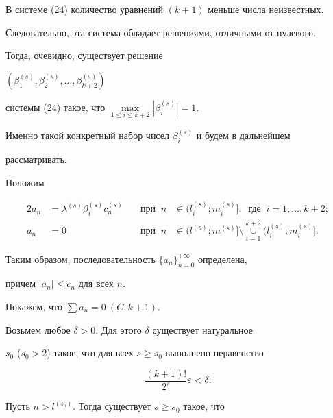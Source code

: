 В системе (24) количество уравнений $(k+1)$ меньше числа неизвестных.


Следовательно, эта система обладает решениями, отличными от нулевого. 


Тогда, очевидно, существует решение 


$(\beta_1^{(s)},\beta_2^{(s)}, \dotsc, \beta_{k+2}^{(s)})$ 


системы (24) такое, что $\max\limits_{1 \le i \le k+2}|\beta_i^{(s)}|=1$.


Именно такой конкретный набор чисел $\beta_i^{(s)}$ и будем в дальнейшем 


рассматривать.





Положим 


\begin{alignat*}{2}


a_n&=\lambda^{(s)} \beta_i^{(s)} c_n^{(s)} &\quad \text{при } 


\ n &\in (l_i^{(s)}; m_i^{(s)}],\ \text{ где }\ i=1, \dotsc, k+2;\\


%


a_n&=0 &\quad \text{при } \ n &\in (l^{(s)}; m^{(s)}]


\setminus \mathop{\cup}\limits_{i=1}^{k+2} (l_i^{(s)}; m_i^{(s)}].


\end{alignat*} 





Таким образом, последовательность $\{a_n \}_{n=0}^{+\infty}$ определена, 


причем $|a_n|\le c_n$ для всех $n$. 





Покажем, что $\sum a_n=0 \ (C, k+1)$.


Возьмем любое $\delta>0$. Для этого $\delta$ существует натуральное


$s_0$ ($s_0>2$) такое, что для всех $s \ge s_0$ выполнено неравенство 


\begin{equation}


\frac{(k+1)!}{2^s} \varepsilon<\delta.


\end{equation}





Пусть $n>l^{(s_0)}$. Тогда существует $s \ge s_0$ такое, что


